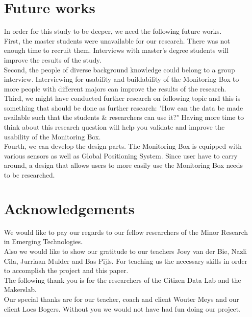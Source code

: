 \documentclass[conference]{IEEEtran}
\begin{document}
\section{Future works}
	In order for this study to be deeper, we need the following future works. \\
	First, the master students were unavailable for our research. There was not enough time to recruit them. Interviews with master's degree students will improve the results of the study.\\
	Second, the people of diverse background knowledge could belong to a group interview. Interviewing for usability and buildability of the Monitoring Box to more people with different majors can improve the results of the research.\\
	Third, we might have conducted further research on following topic and this is something that should be done as further research: "How can the data be made available such that the students \& researchers can use it?" Having more time to think about this research question will help you validate and improve the usability of the Monitoring Box.\\
	Fourth, we can develop the design parts. The Monitoring Box is equipped with various sensors as well as Global Positioning System. Since user have to carry around, a design that allows users to more easily use the Monitoring Box needs to be researched.\\
	
\section{Acknowledgements}
We would like to pay our regards to our fellow researchers of the Minor Research in Emerging Technologies. \\
Also we would like to show our gratitude to our teachers Joey van der Bie, Nazli Cila, Jurriaan Mulder and Bas Pijls. For teaching us the necessary skills in order to accomplish the project and this paper. \\
 The following thank you is for the researchers of the Citizen Data Lab and the Makerslab. \\ 
Our special thanks are for our teacher, coach and client Wouter Meys and our client Loes Bogers. Without you we would not have had fun doing our project. 



\end{document}
